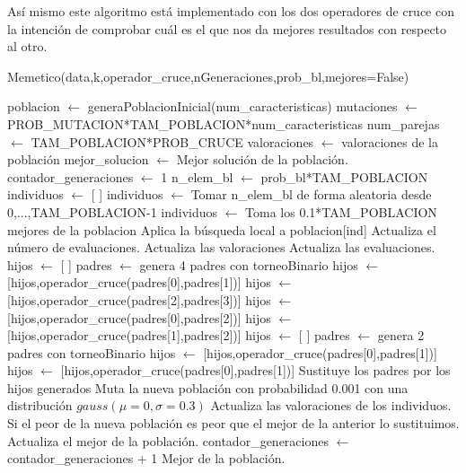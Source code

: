 \documentclass[12pt,a4paper]{article}
\begin{document}
	Así mismo este algoritmo está implementado con los dos operadores de cruce con la intención de comprobar cuál es el que nos da mejores resultados con respecto al otro.
	
	\begin{algorithm}
		\caption{Memetico(data,k,operador\_cruce,nGeneraciones,prob\_bl,mejores=False)}
		\begin{algorithmic}
			\STATE poblacion $\leftarrow$ generaPoblacionInicial(num\_caracteristicas)
			\STATE mutaciones $\leftarrow$ PROB\_MUTACION*TAM\_POBLACION*num\_caracteristicas
			\STATE num\_parejas $\leftarrow$ TAM\_POBLACION*PROB\_CRUCE
			\STATE valoraciones $\leftarrow$ valoraciones de la población
			\STATE mejor\_solucion $\leftarrow$ Mejor solución de la población.
			\STATE contador\_generaciones $\leftarrow$ 1
					\STATE n\_elem\_bl $\leftarrow$ prob\_bl*TAM\_POBLACION
					\STATE individuos $\leftarrow$ [ ]
						\STATE individuos $\leftarrow$ Tomar n\_elem\_bl de forma aleatoria desde 0,...,TAM\_POBLACION-1
					\ELSE
						\STATE individuos $\leftarrow$ Toma los 0.1*TAM\_POBLACION mejores de la poblacion
					\ENDIF
						\STATE Aplica la búsqueda local a poblacion[ind]
						\STATE Actualiza el número de evaluaciones.
					\ENDFOR
					\STATE Actualiza las valoraciones
					\STATE Actualiza las evaluaciones.
				\ENDIF
				\STATE
						\STATE hijos $\leftarrow$ [ ]
						\STATE padres $\leftarrow$ genera 4 padres con torneoBinario
						\STATE hijos $\leftarrow$ [hijos,operador\_cruce(padres[0],padres[1])]
						\STATE hijos $\leftarrow$ [hijos,operador\_cruce(padres[2],padres[3])]
						\STATE hijos $\leftarrow$ [hijos,operador\_cruce(padres[0],padres[2])]
						\STATE hijos $\leftarrow$ [hijos,operador\_cruce(padres[1],padres[2])]
					\ELSE
						\STATE hijos $\leftarrow$ [ ]
						\STATE padres $\leftarrow$ genera 2 padres con torneoBinario
						\STATE hijos $\leftarrow$ [hijos,operador\_cruce(padres[0],padres[1])]
						\STATE hijos $\leftarrow$ [hijos,operador\_cruce(padres[0],padres[1])]
					\ENDIF
					\STATE Sustituye los padres por los hijos generados
				\ENDFOR
				\STATE Muta la nueva población con probabilidad 0.001 con una distribución $gauss(\mu=0,\sigma=0.3)$
				\STATE Actualiza las valoraciones de los individuos.
				\STATE Si el peor de la nueva población es peor que el mejor de la anterior lo sustituimos.
				\STATE Actualiza el mejor de la población.
				\STATE contador\_generaciones $\leftarrow$ contador\_generaciones + 1
			\ENDWHILE
			\RETURN Mejor de la población.
		\end{algorithmic}
	\end{algorithm}
		
\end{document}
